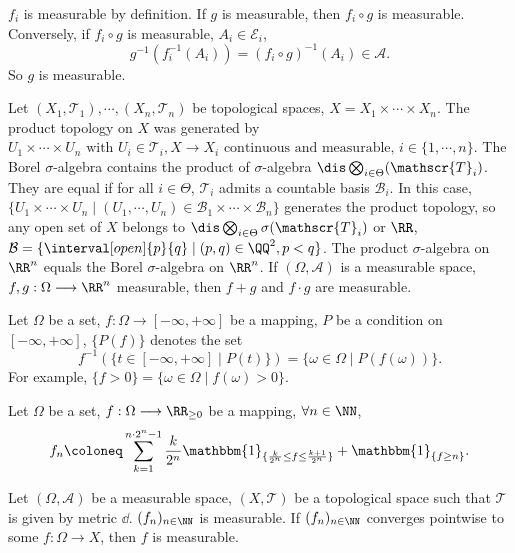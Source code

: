 \begin{proofenv}
    $f_i$ is measurable by definition. If $g$ is measurable, then $f_i\circ g$ is measurable. Conversely, if $f_i\circ g$ is measurable, $A_i\in \mathcal{E}_i$,
    $$ g^{-1}\left(f_i^{-1}\left(A_i\right)\right)=\left(f_i\circ g\right)^{-1}(A_i)\in \mathcal{A}.$$
    So $g$ is measurable.
\end{proofenv}
\begin{remark}
    Let $(X_1,\mathscr{T}_1),\cdots,(X_n, \mathscr{T}_n)$ be topological spaces, $X=X_1\times \cdots\times X_n$. The product topology on $X$ was generated by 
    $U_1\times \cdots \times U_n \text{ with } U_i\in \mathscr{T}_i, X\rightarrow X_i \text{ continuous and measurable, }i\in\{1,\cdots,n\}.$
    The Borel $\sigma$-algebra contains the product of $\sigma$-algebra $\dis \bigotimes_{i\in \Theta}(\mathscr{T}_i)$. They are equal if for all $i\in \Theta$, $\mathscr{T}_i$ admits a countable basis $\mathcal{B}_i$.
    In this case, $\{U_1\times \cdots\times U_n\mid (U_1,\cdots, U_n)\in \mathcal{B}_1\times\cdots\times \mathcal{B}_n\}$ generates the product topology, so any open set of $X$ belongs to $\dis \bigotimes_{i\in \Theta}\sigma(\mathscr{T}_i)$ or $\RR$, $\mathcal{B}=\{\interval[open]{p}{q}\mid (p,q)\in \QQ^2, p<q\}$. The product $\sigma$-algebra on $\RR^n$ equals the Borel $\sigma$-algebra on $\RR^n$.
    If $(\Omega,\mathcal{A})$ is a measurable space, $f,g:\Omega\longrightarrow \RR^n$ measurable, then $f+g$ and $f\cdot g$ are measurable.
\end{remark}
\begin{notationenv}
    Let $\Omega$ be a set, $f:\Omega\longrightarrow [-\infty,+\infty]$ be a mapping, $P$ be a condition on $[-\infty,+\infty]$, $\{P(f)\}$ denotes the set
    $$ f^{-1}\left(\{t\in [-\infty,+\infty]\mid P(t)\}\right)= \{\omega\in \Omega\mid P(f(\omega))\}.$$
    For example, $\{f>0\}=\{\omega\in \Omega\mid  f(\omega)>0\}$.
\end{notationenv}
\begin{remark}
    Let $\Omega$ be a set, $f:\Omega\longrightarrow \RR_{\ge 0}$ be a mapping, $\forall n\in \NN$,
    $$f_n\coloneq \sum_{k=1}^{n\cdot2^n-1} \frac{k}{2^n}\mathbbm{1}_{\{\frac{k}{2^n}\le f\le \frac{k+1}{2^n}\}}+\mathbbm{1}_{\{f\ge n\}}.$$
\end{remark}
\begin{theoremenv}
    Let $(\Omega,\mathcal{A})$ be a measurable space, $(X,\mathscr{T})$ be a topological space such that $\mathscr{T}$ is given by metric $\dd$. $(f_n)_{n\in\NN}$ is measurable. If $(f_n)_{n\in\NN}$ converges pointwise to some $f:\Omega\longrightarrow X$, then $f$ is measurable.
\end{theoremenv}
